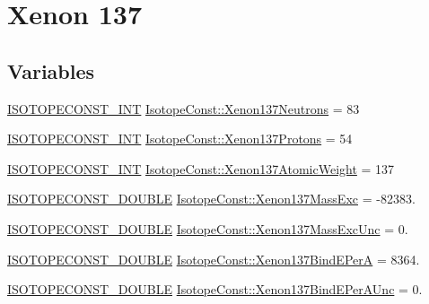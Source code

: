 \hypertarget{group___isotope_const-_xenon-_xe137}{}\section{Xenon 137}
\label{group___isotope_const-_xenon-_xe137}
\subsection*{Variables}
\begin{DoxyCompactItemize}
\item 
\mbox{\hyperlink{group___isotope_const-_macros_ga5f18360b3e99483a35c32d789e62621c}{I\+S\+O\+T\+O\+P\+E\+C\+O\+N\+S\+T\+\_\+\+I\+NT}} \mbox{\hyperlink{group___isotope_const-_xenon-_xe137_gaabcb9d0585238dd2be9dffeb4aad2932}{Isotope\+Const\+::\+Xenon137\+Neutrons}} = 83
\item 
\mbox{\hyperlink{group___isotope_const-_macros_ga5f18360b3e99483a35c32d789e62621c}{I\+S\+O\+T\+O\+P\+E\+C\+O\+N\+S\+T\+\_\+\+I\+NT}} \mbox{\hyperlink{group___isotope_const-_xenon-_xe137_ga91b871b6e505468ef5f81992ec737280}{Isotope\+Const\+::\+Xenon137\+Protons}} = 54
\item 
\mbox{\hyperlink{group___isotope_const-_macros_ga5f18360b3e99483a35c32d789e62621c}{I\+S\+O\+T\+O\+P\+E\+C\+O\+N\+S\+T\+\_\+\+I\+NT}} \mbox{\hyperlink{group___isotope_const-_xenon-_xe137_ga0b7f93eae4a601d34db59b05e3e570c6}{Isotope\+Const\+::\+Xenon137\+Atomic\+Weight}} = 137
\item 
\mbox{\hyperlink{group___isotope_const-_macros_ga8f45a7272ce02c0b4c65c44636ed719a}{I\+S\+O\+T\+O\+P\+E\+C\+O\+N\+S\+T\+\_\+\+D\+O\+U\+B\+LE}} \mbox{\hyperlink{group___isotope_const-_xenon-_xe137_ga75caa72493ea193d4d894f8385b3f900}{Isotope\+Const\+::\+Xenon137\+Mass\+Exc}} = -\/82383.
\item 
\mbox{\hyperlink{group___isotope_const-_macros_ga8f45a7272ce02c0b4c65c44636ed719a}{I\+S\+O\+T\+O\+P\+E\+C\+O\+N\+S\+T\+\_\+\+D\+O\+U\+B\+LE}} \mbox{\hyperlink{group___isotope_const-_xenon-_xe137_ga7eb6fee9ba819239aed5f3b6da92bbf0}{Isotope\+Const\+::\+Xenon137\+Mass\+Exc\+Unc}} = 0.
\item 
\mbox{\hyperlink{group___isotope_const-_macros_ga8f45a7272ce02c0b4c65c44636ed719a}{I\+S\+O\+T\+O\+P\+E\+C\+O\+N\+S\+T\+\_\+\+D\+O\+U\+B\+LE}} \mbox{\hyperlink{group___isotope_const-_xenon-_xe137_ga4d715cd64747edb9772ce1555320e8c1}{Isotope\+Const\+::\+Xenon137\+Bind\+E\+PerA}} = 8364.
\item 
\mbox{\hyperlink{group___isotope_const-_macros_ga8f45a7272ce02c0b4c65c44636ed719a}{I\+S\+O\+T\+O\+P\+E\+C\+O\+N\+S\+T\+\_\+\+D\+O\+U\+B\+LE}} \mbox{\hyperlink{group___isotope_const-_xenon-_xe137_gacb792f1924d035144cdadfea25717dd2}{Isotope\+Const\+::\+Xenon137\+Bind\+E\+Per\+A\+Unc}} = 0.

\end{DoxyCompactItemize}
